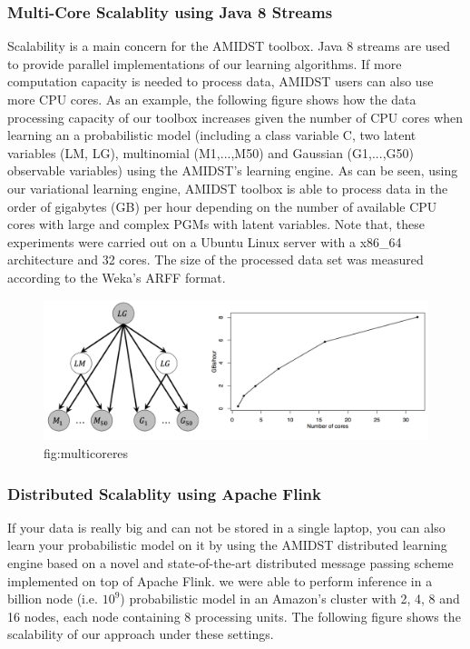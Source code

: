 \documentclass[10pt,a4paper]{article}
\begin{document}
\subsubsection{Multi-Core Scalablity using Java 8 Streams}
Scalability is a main concern for the AMIDST toolbox. Java 8 streams are used to provide parallel implementations of our learning algorithms. If more computation capacity is needed to process data, AMIDST users can also use more CPU cores. As an example, the following figure shows how the data processing capacity of our toolbox increases given the number of CPU cores when learning an a probabilistic model (including a class variable C, two latent variables (LM, LG), multinomial (M1,...,M50) and Gaussian (G1,...,G50) observable variables) using the AMIDST's learning engine. As can be seen, using our variational learning engine, AMIDST toolbox is able to process data in the order of gigabytes (GB) per hour depending on the number of available CPU cores with large and complex PGMs with latent variables. Note that, these experiments were carried out on a Ubuntu Linux server with a x86\_64 architecture and 32 cores. The size of the processed data set was measured according to the Weka's ARFF format.


\begin{figure}[h!]
	\centering
	\includegraphics[width=15cm]{img/multicore_res.png}
	\caption{fig:multicoreres}
\end{figure}


\subsubsection{Distributed Scalablity using Apache Flink}
If your data is really big and can not be stored in a single laptop, you can also learn your probabilistic model on it by using the AMIDST distributed learning engine based on a novel and state-of-the-art distributed message passing scheme implemented on top of Apache Flink. we were able to perform inference in a billion node (i.e. $10^9$) probabilistic model in an Amazon's cluster with 2, 4, 8 and 16 nodes, each node containing 8 processing units. The following figure shows the scalability of our approach under these settings.
\end{document}
